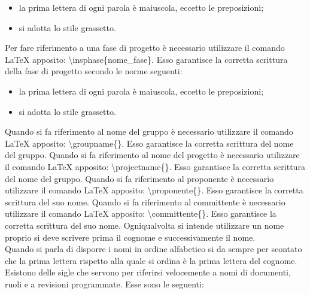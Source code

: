 						\begin{itemize}
							\item la prima lettera di ogni parola è maiuscola, eccetto le preposizioni;
							\item si adotta lo stile grassetto.
						\end{itemize}
						Per fare riferimento a una fase di progetto è necessario utilizzare il comando \LaTeX{} apposito: \textbackslash insphase\{nome\_fase\}. Esso garantisce la corretta scrittura della fase di progetto secondo le norme seguenti:
						\begin{itemize}
							\item la prima lettera di ogni parola è maiuscola, eccetto le preposizioni;
							\item si adotta lo stile grassetto.
						\end{itemize}
						Quando si fa riferimento al nome del gruppo è necessario utilizzare il comando \LaTeX{} apposito: \textbackslash groupname\{\}. Esso garantisce la corretta scrittura del nome del gruppo.
						Quando si fa riferimento al nome del progetto è necessario utilizzare il comando \LaTeX{} apposito: \textbackslash projectname\{\}. Esso garantisce la corretta scrittura del nome del gruppo.
						Quando si fa riferimento al proponente è necessario utilizzare il comando \LaTeX{} apposito: \textbackslash proponente\{\}. Esso garantisce la corretta scrittura del suo nome.
						Quando si fa riferimento al committente è necessario utilizzare il comando \LaTeX{} apposito: \textbackslash committente\{\}. Esso garantisce la corretta scrittura del suo nome.
						Ogniqualvolta si intende utilizzare un nome proprio si deve scrivere prima il cognome e successivamente il nome.\\
						Quando si parla di disporre i nomi in ordine alfabetico si da sempre per scontato che la prima lettera rispetto alla quale si ordina è la prima lettera del cognome.
					\label{sec:sigle}
						Esistono delle sigle che servono per riferirsi velocemente a nomi di documenti, ruoli e a revisioni programmate. Esse sono le seguenti:
